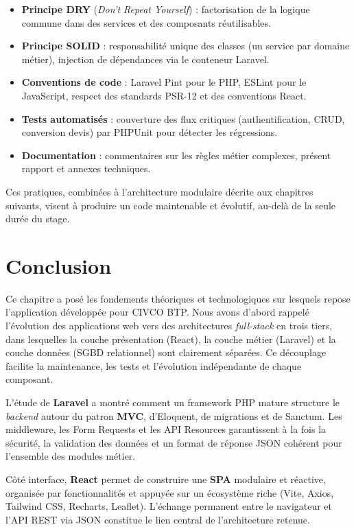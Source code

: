 \begin{itemize}
  \item \textbf{Principe DRY} (\textit{Don't Repeat Yourself}) : factorisation de
  la logique commune dans des services et des composants réutilisables.
  \item \textbf{Principe SOLID} : responsabilité unique des classes (un service par
  domaine métier), injection de dépendances via le conteneur Laravel.
  \item \textbf{Conventions de code} : Laravel Pint pour le PHP, ESLint pour le
  JavaScript, respect des standards PSR-12 et des conventions React.
  \item \textbf{Tests automatisés} : couverture des flux critiques (authentification,
  CRUD, conversion devis) par PHPUnit pour détecter les régressions.
  \item \textbf{Documentation} : commentaires sur les règles métier complexes,
  présent rapport et annexes techniques.
\end{itemize}

Ces pratiques, combinées à l'architecture modulaire décrite aux chapitres suivants,
visent à produire un code maintenable et évolutif, au-delà de la seule durée du stage.

\newpage
\section*{Conclusion}

Ce chapitre a posé les fondements théoriques et technologiques sur lesquels repose
l'application développée pour CIVCO BTP. Nous avons d'abord rappelé l'évolution des
applications web vers des architectures \textit{full-stack} en trois tiers, dans
lesquelles la couche présentation (React), la couche métier (Laravel) et la couche
données (SGBD relationnel) sont clairement séparées. Ce découplage facilite la
maintenance, les tests et l'évolution indépendante de chaque composant.

\medskip

L'étude de \textbf{Laravel} a montré comment un framework PHP mature structure le
\textit{backend} autour du patron \textbf{MVC}, d'Eloquent, de migrations et de
Sanctum. Les middleware, les Form Requests et les API Resources garantissent à la
fois la sécurité, la validation des données et un format de réponse JSON cohérent
pour l'ensemble des modules métier.

\medskip

Côté interface, \textbf{React} permet de construire une \textbf{SPA} modulaire et
réactive, organisée par fonctionnalités et appuyée sur un écosystème riche (Vite,
Axios, Tailwind CSS, Recharts, Leaflet). L'échange permanent entre le navigateur et
l'API REST via JSON constitue le lien central de l'architecture retenue.

